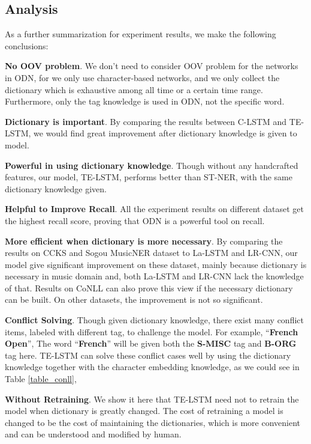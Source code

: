 \documentclass[letterpaper]{article} %
\begin{document}
\subsection{Analysis}



As a further summarization for experiment results, we make the following conclusions:

\textbf{No OOV problem}. We don't need to consider OOV problem for the networks in ODN, for we only use character-based networks, and we only collect the dictionary which is exhaustive among all time or a certain time range. Furthermore, only the tag knowledge is used in ODN, not the specific word.

\textbf{Dictionary is important}. By comparing the results between C-LSTM and TE-LSTM, we would find great improvement after dictionary knowledge is given to model.

\textbf{Powerful in using dictionary knowledge}. Though without any handcrafted features, our model, TE-LSTM, performs better than ST-NER, with the same dictionary knowledge given.

\textbf{Helpful to Improve Recall}. All the experiment results on different dataset get the highest recall score, proving that ODN is a powerful tool on recall.

\textbf{More efficient when dictionary is more necessary}. By comparing the results on CCKS and Sogou MusicNER dataset to La-LSTM and LR-CNN, our model give significant improvement on these dataset, mainly because dictionary is necessary in music domain and, both La-LSTM and LR-CNN lack the knowledge of that. Results on CoNLL can also prove this view if the necessary dictionary can be built. On other datasets, the improvement is not so significant.

\textbf{Conflict Solving}. Though given dictionary knowledge, there exist many conflict items, labeled with different tag, to challenge the model. For example,  ``\textbf{French Open}'', The word ``\textbf{French}'' will be given both the \textbf{S-MISC} tag and \textbf{B-ORG} tag here. TE-LSTM can solve these conflict cases well by using the dictionary knowledge together with the character embedding knowledge, as we could see in Table \ref{table_conll}, 

\textbf{Without Retraining}. We show it here that TE-LSTM need not to retrain the model when dictionary is greatly changed. The cost of retraining a model is changed to be the cost of maintaining the dictionaries, which is more convenient and can be understood and modified by human. 
\end{document}
